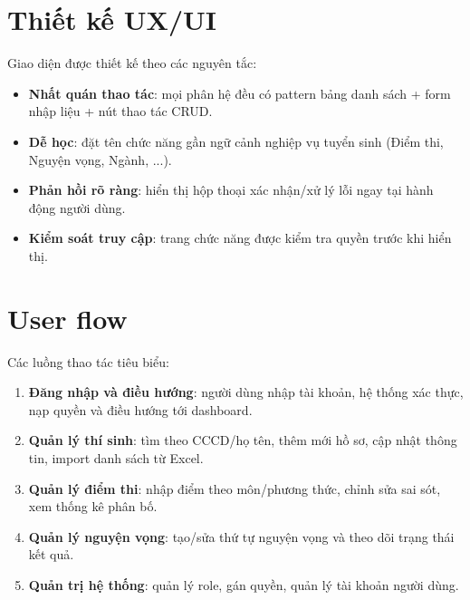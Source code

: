 \documentclass[12pt,a4paper,oneside]{report}
\begin{document}
\section{Thiết kế UX/UI}
Giao diện được thiết kế theo các nguyên tắc:
\begin{itemize}
  \item \textbf{Nhất quán thao tác}: mọi phân hệ đều có pattern bảng danh sách + form nhập liệu + nút thao tác CRUD.
  \item \textbf{Dễ học}: đặt tên chức năng gần ngữ cảnh nghiệp vụ tuyển sinh (Điểm thi, Nguyện vọng, Ngành, ...).
  \item \textbf{Phản hồi rõ ràng}: hiển thị hộp thoại xác nhận/xử lý lỗi ngay tại hành động người dùng.
  \item \textbf{Kiểm soát truy cập}: trang chức năng được kiểm tra quyền trước khi hiển thị.
\end{itemize}

\section{User flow}
Các luồng thao tác tiêu biểu:
\begin{enumerate}
  \item \textbf{Đăng nhập và điều hướng}: người dùng nhập tài khoản, hệ thống xác thực, nạp quyền và điều hướng tới dashboard.
  \item \textbf{Quản lý thí sinh}: tìm theo CCCD/họ tên, thêm mới hồ sơ, cập nhật thông tin, import danh sách từ Excel.
  \item \textbf{Quản lý điểm thi}: nhập điểm theo môn/phương thức, chỉnh sửa sai sót, xem thống kê phân bố.
  \item \textbf{Quản lý nguyện vọng}: tạo/sửa thứ tự nguyện vọng và theo dõi trạng thái kết quả.
  \item \textbf{Quản trị hệ thống}: quản lý role, gán quyền, quản lý tài khoản người dùng.
\end{enumerate}
\end{document}
